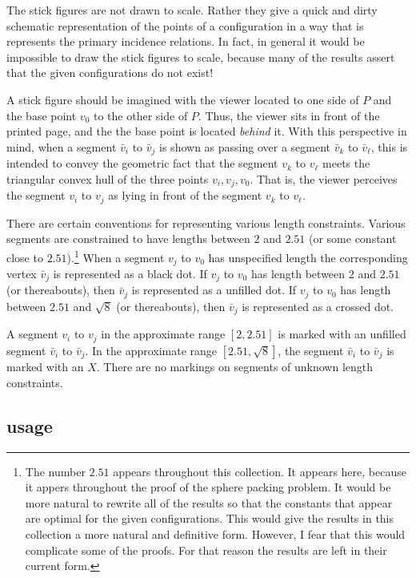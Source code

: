The stick figures are not drawn to scale.  Rather they give
a quick and dirty schematic representation of the points of a configuration
in a way that is represents the primary incidence relations.
In fact, in general it would be impossible to draw the stick figures
to scale, because many of the results assert that the given
configurations do not exist!

A stick figure should be imagined with the viewer located to one
side of $P$ and the base point $v_0$ to the other side of $P$.  Thus,
the viewer sits in front of the printed page, and the
the base point is located {\it behind} it.  With
this perspective in mind, 
when a segment $\bar v_i$ to $\bar v_j$ is shown as
passing over a segment $\bar v_k$ to $\bar v_\ell$, this is intended
to convey the geometric fact that the segment $v_k$ to $v_\ell$ meets
the triangular convex hull of the three points $v_i,v_j,v_0$.  That
is, the viewer perceives the segment $v_i$ to $v_j$ as lying in front
of the segment $v_k$ to $v_\ell$.

There are certain conventions for representing various length constraints.
Various segments are constrained to have lengths between $2$ and $2.51$
(or some constant close to $2.51$).\footnote{The number $2.51$ appears
throughout this collection.  It appears here, because it appers throughout
the proof of the sphere packing problem.  It would be more natural to
rewrite all of the results so that the constants that appear are
optimal for the given configurations.  This would give
the results in this collection a more natural and definitive
form.  However, I fear that this would complicate some of
the proofs.  For that reason the results are left in their
current form.}  When a segment $v_j$ to $v_0$
has unspecified length the corresponding vertex $\bar v_j$ is represented
as a black dot.  If $v_j$ to $v_0$ has length between $2$ and $2.51$
(or thereabouts), then $\bar v_j$ is represented as a unfilled dot.
If $v_j$ to $v_0$ has length between $2.51$ and $\sqrt8$ (or
thereabouts), then $\bar v_j$ is represented as a crossed dot.

A segment $v_i$ to $v_j$ in the approximate range $[2,2.51]$ is marked with
an unfilled segment $\bar v_i$ to $\bar v_j$.  In the approximate
range $[2.51,\sqrt8]$, the segment $\bar v_i$ to $\bar v_j$ is marked
with an $X$.  There are no markings on segments of unknown length
constraints.




\subsection{usage}


